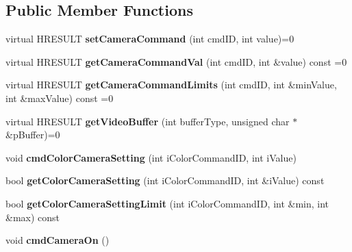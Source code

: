 \subsection*{Public Member Functions}
\begin{DoxyCompactItemize}
\item 
\hypertarget{classTDVCameraInterfaceBase2_a684145d3ee389c45eb5677eab1e55759}{
virtual HRESULT {\bfseries setCameraCommand} (int cmdID, int value)=0}
\label{classTDVCameraInterfaceBase2_a684145d3ee389c45eb5677eab1e55759}

\item 
\hypertarget{classTDVCameraInterfaceBase2_ab6322af8ebc298d65d06b5194441e43b}{
virtual HRESULT {\bfseries getCameraCommandVal} (int cmdID, int \&value) const =0}
\label{classTDVCameraInterfaceBase2_ab6322af8ebc298d65d06b5194441e43b}

\item 
\hypertarget{classTDVCameraInterfaceBase2_a3019b4da3230741db16d122ac7980503}{
virtual HRESULT {\bfseries getCameraCommandLimits} (int cmdID, int \&minValue, int \&maxValue) const =0}
\label{classTDVCameraInterfaceBase2_a3019b4da3230741db16d122ac7980503}

\item 
\hypertarget{classTDVCameraInterfaceBase2_a51410aae9341c6809bedea5c79091d82}{
virtual HRESULT {\bfseries getVideoBuffer} (int bufferType, unsigned char $\ast$\&pBuffer)=0}
\label{classTDVCameraInterfaceBase2_a51410aae9341c6809bedea5c79091d82}

\item 
\hypertarget{classTDVCameraInterfaceBase2_a54e310f7c97367f393a05439b260bc05}{
void {\bfseries cmdColorCameraSetting} (int iColorCommandID, int iValue)}
\label{classTDVCameraInterfaceBase2_a54e310f7c97367f393a05439b260bc05}

\item 
\hypertarget{classTDVCameraInterfaceBase2_a63c1f5ddf8b9af6e7b8b156088c5f789}{
bool {\bfseries getColorCameraSetting} (int iColorCommandID, int \&iValue) const }
\label{classTDVCameraInterfaceBase2_a63c1f5ddf8b9af6e7b8b156088c5f789}

\item 
\hypertarget{classTDVCameraInterfaceBase2_af269978a958edc2dc7baea5bc5bcdef6}{
bool {\bfseries getColorCameraSettingLimit} (int iColorCommandID, int \&min, int \&max) const }
\label{classTDVCameraInterfaceBase2_af269978a958edc2dc7baea5bc5bcdef6}

\item 
\hypertarget{classTDVCameraInterfaceBase2_a8c02c4da359f4e0125c7065819d1e8c7}{
void {\bfseries cmdCameraOn} ()}
\label{classTDVCameraInterfaceBase2_a8c02c4da359f4e0125c7065819d1e8c7}


\end{DoxyCompactItemize}
